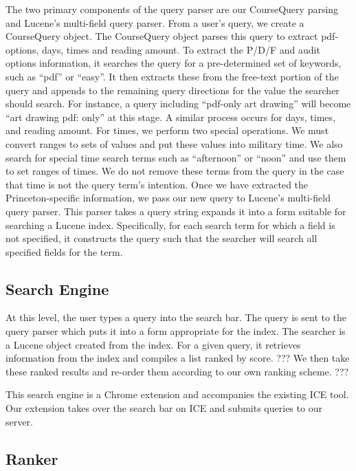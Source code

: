 \documentclass[12pt,letterpaper]{article}
\begin{document}
The two primary components of the query parser are our CourseQuery parsing and Lucene's multi-field query parser. From a user's query, we create a CourseQuery object. The CourseQuery object parses this query to extract pdf-options, days, times and reading amount. To extract the P/D/F and audit options information, it searches the query for a pre-determined set of keywords, such as ``pdf'' or ``easy''. It then extracts these from the free-text portion of the query and appends to the remaining query directions for the value the searcher should search. For instance, a query including ``pdf-only art drawing'' will become ``art drawing pdf: only'' at this stage. A similar process occurs for days, times, and reading amount.
For times, we perform two special operations. We must convert ranges to sets of values and put these values into military time. We also search for special time search terms such as ``afternoon'' or ``noon'' and use them to set ranges of times. We do not remove these terms from the query in the case that time is not the query term's intention. Once we have extracted the Princeton-specific information, we pass our new query to Lucene's multi-field query parser. This parser takes a query string expands it into a form suitable for searching a Lucene index. Specifically, for each search term for which a field is not specified, it constructs the query such that the searcher will search all specified fields for the term. 
	
\subsection{Search Engine}
At this level, the user types a query into the search bar. The query is sent to the query parser which puts it into a form appropriate for the index. The searcher is a Lucene object created from the index. For a given query, it retrieves information from the index and compiles a list ranked by score. ??? We then take these ranked results and re-order them according to our own ranking scheme. ???

This search engine is a Chrome extension and accompanies the existing ICE tool. Our extension takes over the search bar on ICE and submits queries to our server. 
				
		
\subsection{Ranker}
\end{document}
